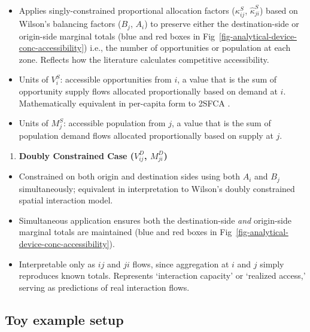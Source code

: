 \documentclass[
  10pt,
  letterpaper,
]{article}
\providecommand{\tightlist}{%
  \setlength{\itemsep}{0pt}\setlength{\parskip}{0pt}}\usepackage{longtable,booktabs,array}
\begin{document}
\begin{itemize}
\tightlist
\item
  Applies singly-constrained proportional allocation factors
  (\(\kappa_{ij}^S\), \(\hat \kappa_{ji}^S\)) based on Wilson's
  balancing factors (\(B_j\), \(A_i\)) to preserve either the
  destination-side or origin-side marginal totals (blue and red boxes in
  Fig~\ref{fig-analytical-device-conc-accessibility}) i.e., the number
  of opportunities or population at each zone. Reflects how the
  literature calculates competitive accessibility.
\item
  Units of \(V_i^S\): accessible opportunities from \(i\), a value that
  is the sum of opportunity supply flows allocated proportionally based
  on demand at \(i\). Mathematically equivalent in per-capita form to
  2SFCA \citep{luo2003}.
\item
  Units of \(M_j^S\): accessible population from \(j\), a value that is
  the sum of population demand flows allocated proportionally based on
  supply at \(j\).
\end{itemize}

\begin{enumerate}
\def\labelenumi{\arabic{enumi}.}
\setcounter{enumi}{3}
\tightlist
\item
  \textbf{Doubly Constrained Case (\(V_{ij}^D\), \(M_{ji}^D\))}
\end{enumerate}

\begin{itemize}
\tightlist
\item
  Constrained on both origin and destination sides using both \(A_i\)
  and \(B_j\) simultaneously; equivalent in interpretation to Wilson's
  \citep{wilson1971} doubly constrained spatial interaction model.
\item
  Simultaneous application ensures both the destination-side \emph{and}
  origin-side marginal totals are maintained (blue and red boxes in
  Fig~\ref{fig-analytical-device-conc-accessibility}).
\item
  Interpretable only as \(ij\) and \(ji\) flows, since aggregation at
  \(i\) and \(j\) simply reproduces known totals. Represents
  `interaction capacity' or `realized access,' serving as predictions of
  real interaction flows.
\end{itemize}

\subsection{Toy example setup}\label{toy-example-setup}
\end{document}
